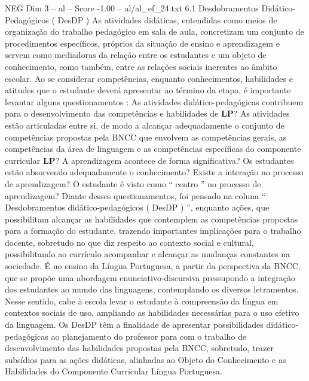 \begin{textsample}{NEG Dim 3 – al – Score -1.00 – al/al\_ef\_24.txt}  \label{ex:f3_neg_073}
6.1 Desdobramentos Didático-Pedagógicos ( DesDP ) As atividades didáticas, entendidas como meios de organização do trabalho pedagógico em sala de aula, concretizam um conjunto de procedimentos específicos, próprios da situação de ensino e aprendizagem e servem como mediadoras da relação entre os estudantes e um objeto de conhecimento, como também, entre as relações sociais inerentes ao âmbito escolar.
Ao se considerar competências, enquanto conhecimentos, habilidades e atitudes que o estudante deverá apresentar ao término da etapa, é importante levantar alguns questionamentos : As atividades didático-pedagógicas contribuem para o desenvolvimento das competências e habilidades de \textbf{LP}?
As atividades estão articuladas entre si, de modo a alcançar adequadamente o conjunto de competências propostas pela BNCC que envolvem as competências gerais, as competências da área de linguagem e as competências específicas do componente curricular \textbf{LP}?
A aprendizagem acontece de forma significativa?
Os estudantes estão absorvendo adequadamente o conhecimento?
Existe a interação no processo de aprendizagem?
O estudante é visto como “ centro ” no processo de aprendizagem?
Diante desses questionamentos, foi pensado na coluna “ Desdobramentos didático-pedagógicos ( DesDP ) ”, enquanto ações, que possibilitam alcançar as habilidades que contemplem as competências propostas para a formação do estudante, trazendo importantes implicações para o trabalho docente, sobretudo no que diz respeito ao contexto social e cultural, possibilitando ao currículo acompanhar e alcançar as mudanças constantes na sociedade.
É no ensino da Língua Portuguesa, a partir da perspectiva da BNCC, que se propõe uma abordagem enunciativo-discursiva pressupondo a integração dos estudantes ao mundo das linguagens, contemplando os diversos letramentos.
Nesse sentido, cabe à escola levar o estudante à compreensão da língua em contextos sociais de uso, ampliando as habilidades necessárias para o uso efetivo da linguagem.
Os DesDP têm a finalidade de apresentar possibilidades didático-pedagógicas ao planejamento do professor para com o trabalho de desenvolvimento das habilidades propostas pela BNCC, sobretudo, trazer subsídios para as ações didáticas, alinhadas ao Objeto do Conhecimento e as Habilidades do Componente Curricular Língua Portuguesa.

\end{textsample}
